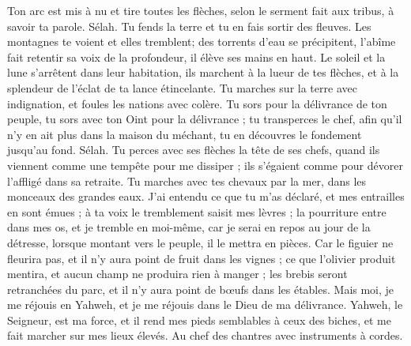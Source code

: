 \begin{multicols}{2}
Ton arc est mis à nu et tire toutes les flèches, selon le serment fait aux tribus, à savoir ta parole. Sélah. Tu fends la terre et tu en fais sortir des fleuves.
Les montagnes te voient et elles tremblent; des torrents d'eau se précipitent, l'abîme fait retentir sa voix de la profondeur, il élève ses mains en haut.
Le soleil et la lune s'arrêtent dans leur habitation, ils marchent à la lueur de tes flèches, et à la splendeur de l'éclat de ta lance étincelante.
Tu marches sur la terre avec indignation, et foules les nations avec colère.
Tu sors pour la délivrance de ton peuple, tu sors avec ton Oint pour la délivrance ; tu transperces le chef, afin qu'il n'y en ait plus dans la maison du méchant, tu en découvres le fondement jusqu'au fond. Sélah.
Tu perces avec ses flèches la tête de ses chefs, quand ils viennent comme une tempête pour me dissiper ; ils s'égaient comme pour dévorer l'affligé dans sa retraite.
Tu marches avec tes chevaux par la mer, dans les monceaux des grandes eaux.
J'ai entendu ce que tu m'as déclaré, et mes entrailles en sont émues ; à ta voix le tremblement saisit mes lèvres ; la pourriture entre dans mes os, et je tremble en moi-même, car je serai en repos au jour de la détresse, lorsque montant vers le peuple, il le mettra en pièces.
Car le figuier ne fleurira pas, et il n'y aura point de fruit dans les vignes ; ce que l'olivier produit mentira, et aucun champ ne produira rien à manger ; les brebis seront retranchées du parc, et il n'y aura point de bœufs dans les étables.
Mais moi, je me réjouis en Yahweh, et je me réjouis dans le Dieu de ma délivrance.
Yahweh, le Seigneur, est ma force, et il rend mes pieds semblables à ceux des biches, et me fait marcher sur mes lieux élevés. Au chef des chantres avec instruments à cordes.
\PPE{}
\end{multicols}
